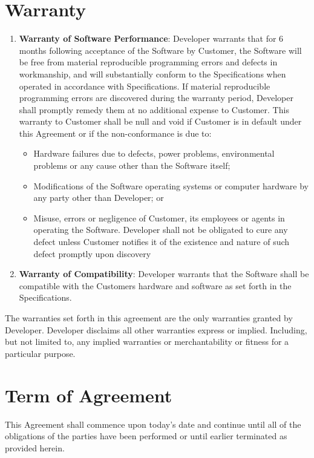 \documentclass[11pt]{article}
\begin{document}
\section{Warranty}
\begin{enumerate}
\renewcommand{\labelenumi}{(\Alph{enumi})}
\item {\bf Warranty of Software Performance}: Developer warrants that for 6 months following acceptance of the Software by Customer, the Software will be free from material reproducible programming errors and defects in workmanship, and will substantially conform to the Specifications when operated in accordance with Specifications. If material reproducible programming errors are discovered during the warranty period, Developer shall promptly remedy them at no additional expense to Customer. This warranty to Customer shall be null and void if Customer is in default under this Agreement or if the non-conformance is due to:
\begin{itemize}
\item Hardware failures due to defects, power problems, environmental problems or any cause other than the Software itself;
\item Modifications of the Software operating systems or computer hardware by any party other than Developer; or
\item Misuse, errors or negligence of Customer, its employees or agents in operating the Software. Developer shall not be obligated to cure any defect unless Customer notifies it of the existence and nature of such defect promptly upon discovery
\end{itemize}
\item {\bf  Warranty of Compatibility}: Developer warrants that the Software shall be compatible with the Customers hardware and software as set forth in the Specifications. 
\end{enumerate}
The warranties set forth in this agreement are the only warranties granted by Developer. Developer disclaims all other warranties express or implied. Including, but not limited to, any implied warranties or merchantability or fitness for a particular purpose.
\section{Term of Agreement}
This Agreement shall commence upon today’s date and continue until all of the obligations of the parties have been performed or until earlier terminated as provided herein.
\end{document}

